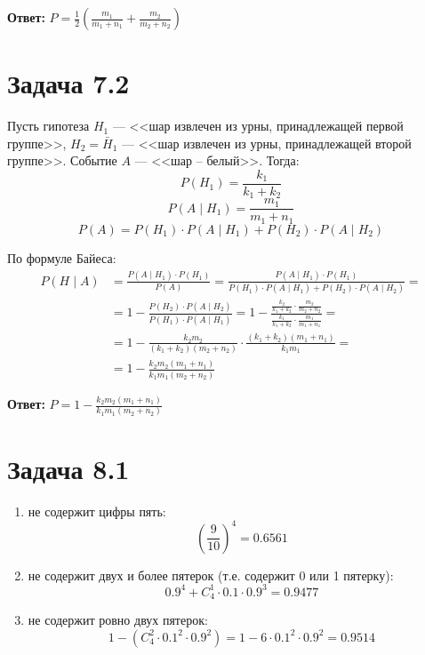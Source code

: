 \documentclass{article}
\begin{document}
\textbf{Ответ:}
\( P = \frac{1}{2} \left( \frac{m_1}{m_1 + n_1} + \frac{m_2}{m_2 + n_2} \right) \)

\section{Задача 7.2}
Пусть гипотеза \(H_1\) --- <<шар извлечен из урны, принадлежащей первой группе>>,
\(H_2 = \bar H_1 \) --- <<шар извлечен из урны, принадлежащей второй группе>>.
Событие \(A\) --- <<шар -- белый>>.
Тогда:
\[ P(H_1) = \frac{k_1}{k_1 + k_2} \]
\[ P(A \mid H_1) = \frac{m_1}{m_1 + n_1} \]
\[ P(A) = P(H_1) \cdot P(A \mid H_1) + P(H_2) \cdot P(A \mid H_2) \]

По формуле Байеса:
\begin{align*}
	P(H \mid A) & =
	\frac{P(A \mid H_1) \cdot P(H_1)}{P(A)} =
	\frac{P(A \mid H_1) \cdot P(H_1)}{P(H_1) \cdot P(A \mid H_1) + P(H_2) \cdot P(A \mid H_2)} =                      \\
	            & =
	1 - \frac{P(H_2) \cdot P(A \mid H_2)}{P(H_1) \cdot P(A \mid H_1)} =
	1 - \frac{ \frac{k_2}{k_1+k_2} \cdot \frac{m_2}{m_2 + n_2} }{\frac{k_1}{k_1 + k_2} \cdot \frac{m_1}{m_1 + n_1}} = \\
	            & =
	1 - \frac{k_2 m_2}{(k_1 + k_2)(m_2 + n_2)} \cdot \frac{(k_1 + k_2) (m_1 + n_1)}{k_1 m_1} =                        \\
	            & =
	1 - \frac{k_2 m_2 (m_1 + n_1)}{k_1 m_1 (m_2 + n_2)}
\end{align*}

\textbf{Ответ:} \(P = 1 - \frac{k_2 m_2 (m_1 + n_1)}{k_1 m_1 (m_2 + n_2)} \)

\section{Задача 8.1}
\begin{enumerate}
	\item не содержит цифры пять:
	      \[ \left(\frac{9}{10}\right)^4 = 0.6561 \]
	\item не содержит двух и более пятерок (т.е. содержит 0 или 1 пятерку):
	      \[
		      0.9^4 + C_4^1 \cdot 0.1 \cdot 0.9^3 = 0.9477
	      \]
	\item не содержит ровно двух пятерок:
	      \[
		      1 - \left(C_4^2 \cdot 0.1^2 \cdot 0.9^2 \right) =
		      1 - 6 \cdot 0.1^2 \cdot 0.9^2 =
		      0.9514
	      \]
\end{enumerate}
\end{document}
